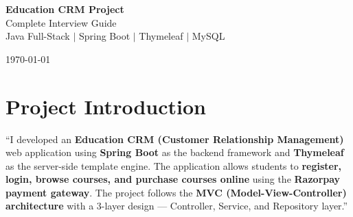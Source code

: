 \documentclass[12pt,a4paper]{article}
\begin{document}
\begin{titlepage}
\centering
\vspace*{3cm}

{\Huge\bfseries\color{primaryblue} Education CRM Project\\[0.3cm]}
{\LARGE\color{secondaryblue} Complete Interview Guide\\[0.5cm]}
{\Large Java Full-Stack $\mid$ Spring Boot $\mid$ Thymeleaf $\mid$ MySQL\\[2cm]}


\vfill
{\large\color{darkgray} \today}
\end{titlepage}

\tableofcontents
\newpage

\section{Project Introduction}

\begin{answerbox}
``I developed an \textbf{Education CRM (Customer Relationship Management)} web application using \textbf{Spring Boot} as the backend framework and \textbf{Thymeleaf} as the server-side template engine. The application allows students to \textbf{register, login, browse courses, and purchase courses online} using the \textbf{Razorpay payment gateway}. The project follows the \textbf{MVC (Model-View-Controller) architecture} with a 3-layer design --- Controller, Service, and Repository layer.''
\end{answerbox}
\end{document}
